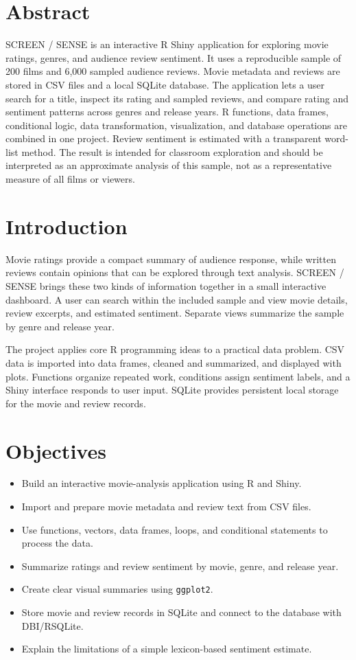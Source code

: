 \documentclass[12pt,a4paper]{report}
\begin{document}
\chapter{Abstract}
SCREEN / SENSE is an interactive R Shiny application for exploring movie ratings, genres, and audience review sentiment. It uses a reproducible sample of 200 films and 6,000 sampled audience reviews. Movie metadata and reviews are stored in CSV files and a local SQLite database. The application lets a user search for a title, inspect its rating and sampled reviews, and compare rating and sentiment patterns across genres and release years. R functions, data frames, conditional logic, data transformation, visualization, and database operations are combined in one project. Review sentiment is estimated with a transparent word-list method. The result is intended for classroom exploration and should be interpreted as an approximate analysis of this sample, not as a representative measure of all films or viewers.

\chapter{Introduction}
Movie ratings provide a compact summary of audience response, while written reviews contain opinions that can be explored through text analysis. SCREEN / SENSE brings these two kinds of information together in a small interactive dashboard. A user can search within the included sample and view movie details, review excerpts, and estimated sentiment. Separate views summarize the sample by genre and release year.

The project applies core R programming ideas to a practical data problem. CSV data is imported into data frames, cleaned and summarized, and displayed with plots. Functions organize repeated work, conditions assign sentiment labels, and a Shiny interface responds to user input. SQLite provides persistent local storage for the movie and review records.

\chapter{Objectives}
\begin{itemize}
  \item Build an interactive movie-analysis application using R and Shiny.
  \item Import and prepare movie metadata and review text from CSV files.
  \item Use functions, vectors, data frames, loops, and conditional statements to process the data.
  \item Summarize ratings and review sentiment by movie, genre, and release year.
  \item Create clear visual summaries using \texttt{ggplot2}.
  \item Store movie and review records in SQLite and connect to the database with DBI/RSQLite.
  \item Explain the limitations of a simple lexicon-based sentiment estimate.
\end{itemize}
\end{document}
